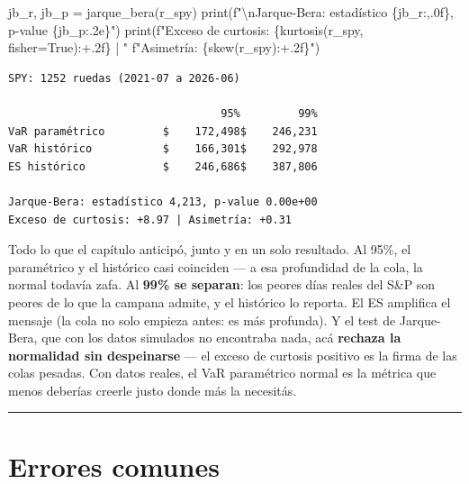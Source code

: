 \documentclass[
  spanish,
  letterpaper,
  DIV=11,
  numbers=noendperiod]{scrreprt}
\newenvironment{Shaded}{\begin{snugshade}}{\end{snugshade}}
\newcommand{\BuiltInTok}[1]{\textcolor[rgb]{0.00,0.23,0.31}{#1}}
\newcommand{\CharTok}[1]{\textcolor[rgb]{0.13,0.47,0.30}{#1}}
\newcommand{\NormalTok}[1]{\textcolor[rgb]{0.00,0.23,0.31}{#1}}
\newcommand{\OperatorTok}[1]{\textcolor[rgb]{0.37,0.37,0.37}{#1}}
\newcommand{\SpecialCharTok}[1]{\textcolor[rgb]{0.37,0.37,0.37}{#1}}
\newcommand{\SpecialStringTok}[1]{\textcolor[rgb]{0.13,0.47,0.30}{#1}}
\newcommand{\VariableTok}[1]{\textcolor[rgb]{0.07,0.07,0.07}{#1}}
\begin{document}
\begin{Shaded}
\begin{Highlighting}[]
\NormalTok{jb\_r, jb\_p }\OperatorTok{=}\NormalTok{ jarque\_bera(r\_spy)}
\BuiltInTok{print}\NormalTok{(}\SpecialStringTok{f"}\CharTok{\textbackslash{}n}\SpecialStringTok{Jarque{-}Bera: estadístico }\SpecialCharTok{\{}\NormalTok{jb\_r}\SpecialCharTok{:,.0f\}}\SpecialStringTok{, p{-}value }\SpecialCharTok{\{}\NormalTok{jb\_p}\SpecialCharTok{:.2e\}}\SpecialStringTok{"}\NormalTok{)}
\BuiltInTok{print}\NormalTok{(}\SpecialStringTok{f"Exceso de curtosis: }\SpecialCharTok{\{}\NormalTok{kurtosis(r\_spy, fisher}\OperatorTok{=}\VariableTok{True}\NormalTok{)}\SpecialCharTok{:+.2f\}}\SpecialStringTok{ | "}
      \SpecialStringTok{f"Asimetría: }\SpecialCharTok{\{}\NormalTok{skew(r\_spy)}\SpecialCharTok{:+.2f\}}\SpecialStringTok{"}\NormalTok{)}
\end{Highlighting}
\end{Shaded}

\begin{verbatim}
SPY: 1252 ruedas (2021-07 a 2026-06)

                                 95%         99%
VaR paramétrico         $    172,498$    246,231
VaR histórico           $    166,301$    292,978
ES histórico            $    246,686$    387,806

Jarque-Bera: estadístico 4,213, p-value 0.00e+00
Exceso de curtosis: +8.97 | Asimetría: +0.31
\end{verbatim}

Todo lo que el capítulo anticipó, junto y en un solo resultado. Al 95\%,
el paramétrico y el histórico casi coinciden --- a esa profundidad de la
cola, la normal todavía zafa. Al \textbf{99\% se separan}: los peores
días reales del S\&P son peores de lo que la campana admite, y el
histórico lo reporta. El ES amplifica el mensaje (la cola no solo
empieza antes: es más profunda). Y el test de Jarque-Bera, que con los
datos simulados no encontraba nada, acá \textbf{rechaza la normalidad
sin despeinarse} --- el exceso de curtosis positivo es la firma de las
colas pesadas. Con datos reales, el VaR paramétrico normal es la métrica
que menos deberías creerle justo donde más la necesitás.

\begin{center}\rule{0.5\linewidth}{0.5pt}\end{center}

\chapter{Errores comunes}\label{errores-comunes-9}
\end{document}
